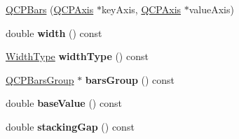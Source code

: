 \begin{DoxyCompactItemize}
\item 
\hyperlink{classQCPBars_a64006999ad9dff308f40df41cef176ad}{Q\+C\+P\+Bars} (\hyperlink{classQCPAxis}{Q\+C\+P\+Axis} $\ast$key\+Axis, \hyperlink{classQCPAxis}{Q\+C\+P\+Axis} $\ast$value\+Axis)
\item 
double {\bfseries width} () const \hypertarget{classQCPBars_a42798c38abd5f5db22bd45d77f429625}{}\label{classQCPBars_a42798c38abd5f5db22bd45d77f429625}

\item 
\hyperlink{classQCPBars_a65dbbf1ab41cbe993d71521096ed4649}{Width\+Type} {\bfseries width\+Type} () const \hypertarget{classQCPBars_a8606651ada5804075f6affd04c88dd05}{}\label{classQCPBars_a8606651ada5804075f6affd04c88dd05}

\item 
\hyperlink{classQCPBarsGroup}{Q\+C\+P\+Bars\+Group} $\ast$ {\bfseries bars\+Group} () const \hypertarget{classQCPBars_a6d6b2b17619a0ba9c7a88bb2b90fc178}{}\label{classQCPBars_a6d6b2b17619a0ba9c7a88bb2b90fc178}

\item 
double {\bfseries base\+Value} () const \hypertarget{classQCPBars_a3c8686a74396883fd1da87b2e325b043}{}\label{classQCPBars_a3c8686a74396883fd1da87b2e325b043}

\item 
double {\bfseries stacking\+Gap} () const \hypertarget{classQCPBars_af2cdffc1a2adb784ec06a986691750cb}{}\label{classQCPBars_af2cdffc1a2adb784ec06a986691750cb}


\end{DoxyCompactItemize}
